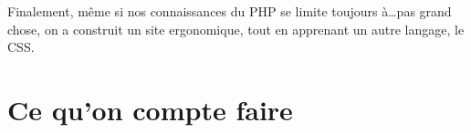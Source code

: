 \documentclass[]{report}
\begin{document}
		Finalement, même si nos connaissances du PHP se limite toujours à\ldots pas grand chose, on a construit un site ergonomique, tout en apprenant un autre langage, le CSS.




\part{Ce qu'on compte faire} %
\label{prt:ce_qu_on_compte_faire}


















 
 
\end{document}
